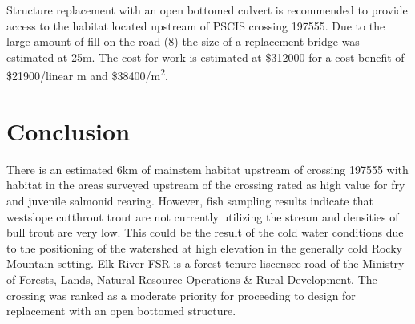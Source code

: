 \documentclass[
]{book}
\begin{document}
Structure replacement with an open bottomed culvert is recommended to provide access to the habitat located upstream of PSCIS crossing 197555. Due to the large amount of fill on the road (8) the size of a replacement bridge was estimated at 25m. The cost for work is estimated at \$312000 for a cost benefit of \$21900/linear m and \$38400/m\textsuperscript{2}.

\hypertarget{conclusion-4}{%
\section*{Conclusion}\label{conclusion-4}}

There is an estimated 6km of mainstem habitat upstream of crossing 197555 with habitat in the areas surveyed upstream of the crossing rated as high value for fry and juvenile salmonid rearing. However, fish sampling results indicate that westslope cutthrout trout are not currently utilizing the stream and densities of bull trout are very low. This could be the result of the cold water conditions due to the positioning of the watershed at high elevation in the generally cold Rocky Mountain setting. Elk River FSR is a forest tenure liscensee road of the Ministry of Forests, Lands, Natural Resource Operations \& Rural Development. The crossing was ranked as a moderate priority for proceeding to design for replacement with an open bottomed structure.
\end{document}
